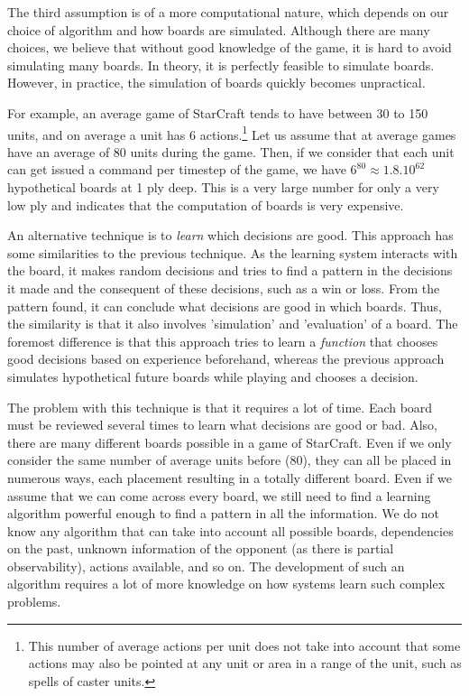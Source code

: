 The third assumption is of a more computational nature, which depends on our choice of algorithm and how boards are simulated. Although there are many choices, we believe that without good knowledge of the game, it is hard to avoid simulating many boards. In theory, it is perfectly feasible to simulate boards. However, in practice, the simulation of boards quickly becomes unpractical.

For example, an average game of StarCraft tends to have between 30 to 150 units, and on average a unit has 6 actions.\footnote{This number of average actions per unit does not take into account that some actions may also be pointed at any unit or area in a range of the unit, such as spells of caster units.} Let us assume that at average games have an average of 80 units during the game. Then, if we consider that each unit can get issued a command per timestep of the game, we have $6^{80} \approx 1.8.10^{62}$ hypothetical boards at 1 ply deep. This is a very large number for only a very low ply and indicates that the computation of boards is very expensive.

An alternative technique is to \emph{learn} which decisions are good. This approach has some similarities to the previous technique. As the learning system interacts with the board, it makes random decisions and tries to find a pattern in the decisions it made and the consequent of these decisions, such as a win or loss. From the pattern found, it can conclude what decisions are good in which boards. Thus, the similarity is that it also involves 'simulation' and 'evaluation' of a board. The foremost difference is that this approach tries to learn a \emph{function} that chooses good decisions based on experience beforehand, whereas the previous approach simulates hypothetical future boards while playing and chooses a decision.

The problem with this technique is that it requires a lot of time. Each board must be reviewed several times to learn what decisions are good or bad. Also, there are many different boards possible in a game of StarCraft. Even if we only consider the same number of average units before (80), they can all be placed in numerous ways, each placement resulting in a totally different board. Even if we assume that we can come across every board, we still need to find a learning algorithm powerful enough to find a pattern in all the information. We do not know any algorithm that can take into account all possible boards, dependencies on the past, unknown information of the opponent (as there is partial observability), actions available, and so on. The development of such an algorithm requires a lot of more knowledge on how systems learn such complex problems.

